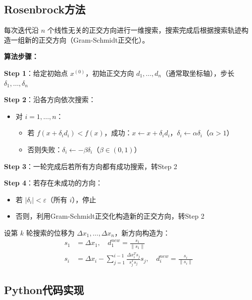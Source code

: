 \subsection{Rosenbrock方法}\label{sec:rosenbrock}

\begin{conceptbox}[基本思想]
每次迭代沿 $n$ 个线性无关的正交方向进行一维搜索，搜索完成后根据搜索轨迹构造一组新的正交方向（Gram-Schmidt正交化）。
\end{conceptbox}

\textbf{算法步骤：}

\textbf{Step 1}：给定初始点 $x^{(0)}$，初始正交方向 $d_1, \ldots, d_n$（通常取坐标轴），步长 $\delta_1, \ldots, \delta_n$

\textbf{Step 2}：沿各方向依次搜索：
\begin{itemize}
    \item 对 $i = 1, \ldots, n$：
    \begin{itemize}
        \item 若 $f(x + \delta_i d_i) < f(x)$，成功：$x \leftarrow x + \delta_i d_i$，$\delta_i \leftarrow \alpha \delta_i$（$\alpha > 1$）
        \item 否则失败：$\delta_i \leftarrow -\beta \delta_i$（$\beta \in (0, 1)$）
    \end{itemize}
\end{itemize}

\textbf{Step 3}：一轮完成后若所有方向都有成功搜索，转Step 2

\textbf{Step 4}：若存在未成功的方向：
\begin{itemize}
    \item 若 $|\delta_i| < \varepsilon$（所有 $i$），停止
    \item 否则，利用Gram-Schmidt正交化构造新的正交方向，转Step 2
\end{itemize}

\begin{notebox}
设第 $k$ 轮搜索的位移为 $\Delta x_1, \ldots, \Delta x_n$，新方向构造为：
\begin{align*}
s_1 &= \Delta x_1, \quad d_1^{new} = \frac{s_1}{\|s_1\|} \\
s_i &= \Delta x_i - \sum_{j=1}^{i-1} \frac{\Delta x_i^T s_j}{s_j^T s_j} s_j, \quad d_i^{new} = \frac{s_i}{\|s_i\|}
\end{align*}
\end{notebox}

\subsection{Python代码实现}\label{sec:df-code}

